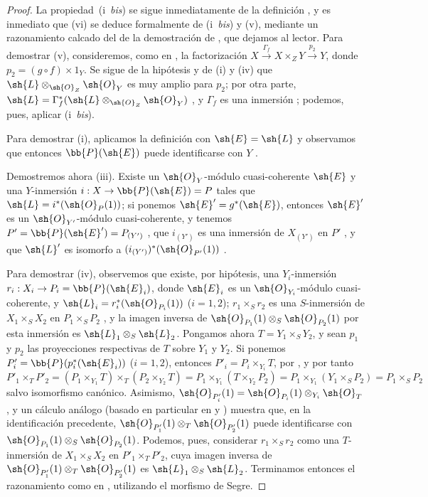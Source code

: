 \documentclass[oneside,10pt]{amsart}
\makeatletter
\newcommand{\ega@arrow}[2]{\mathchoice{#1}{#2}{#2}{#2}}
\renewcommand{\to}{\ega@arrow{\longrightarrow}{\rightarrow}}
\newcommand{\oldpage}[2][]{\marginnote{\normalfont\footnotesize\textbf{#1}~|~#2}\ignorespaces}
\makeatother
\begin{document}
\begin{proof}
La propiedad~(i~\emph{bis}) se sigue inmediatamente de la definición , y es inmediato que (vi) se deduce formalmente de (i~\emph{bis}) y (v), mediante un razonamiento calcado del de la demostración de , que dejamos al lector.
Para demostrar (v), consideremos, como en , la factorización $X\xrightarrow{\Gamma_f}X\times_Z Y\xrightarrow{p_2}Y$, donde $p_2=(g\circ f)\times1_Y$.
Se sigue de la hipótesis y de (i) y (iv) que $\sh{L}\otimes_{\sh{O}_Z}\sh{O}_Y$ es muy amplio para $p_2$;
por otra parte, $\sh{L}=\Gamma_f^*(\sh{L}\otimes_{\sh{O}_Z}\sh{O}_Y)$ , y $\Gamma_f$ es una inmersión ;
podemos, pues, aplicar (i~\emph{bis}).

\oldpage[II]{82}
Para demostrar (i), aplicamos la definición  con $\sh{E}=\sh{L}$ y observamos que entonces $\bb{P}(\sh{E})$ puede identificarse con $Y$ .

Demostremos ahora (iii).
Existe un $\sh{O}_Y$-módulo cuasi-coherente $\sh{E}$ y una $Y$-inmersión $i:X\to\bb{P}(\sh{E})=P$ tales que $\sh{L}=i^*(\sh{O}_P(1))$;
si ponemos $\sh{E}'=g^*(\sh{E})$, entonces $\sh{E}'$ es un $\sh{O}_{Y'}$-módulo cuasi-coherente, y tenemos $P'=\bb{P}(\sh{E}')=P_{(Y')}$ , que $i_{(Y')}$ es una inmersión de $X_{(Y')}$ en $P'$ , y que $\sh{L}'$ es isomorfo a $(i_{(Y')})^*(\sh{O}_{P'}(1))$ .

Para demostrar (iv), observemos que existe, por hipótesis, una $Y_i$-inmersión $r_i:X_i\to P_i=\bb{P}(\sh{E}_i)$, donde $\sh{E}_i$ es un $\sh{O}_{Y_i}$-módulo cuasi-coherente, y $\sh{L}_i=r_i^*(\sh{O}_{P_i}(1))$ ($i=1,2$);
$r_1\times_S r_2$ es una $S$-inmersión de $X_1\times_S X_2$ en $P_1\times_S P_2$ , y la imagen inversa de $\sh{O}_{P_1}(1)\otimes_S\sh{O}_{P_2}(1)$ por esta inmersión es $\sh{L}_1\otimes_S\sh{L}_2$.
Pongamos ahora $T=Y_1\times_S Y_2$, y sean $p_1$ y $p_2$ las proyecciones respectivas de $T$ sobre $Y_1$ y $Y_2$.
Si ponemos $P'_i=\bb{P}(p_i^*(\sh{E}_i))$ ($i=1,2$), entonces $P'_i=P_i\times_{Y_i}T$, por , y por tanto
\[
  P'_1\times_T P'_2
  =(P_1\times_{Y_1}T)\times_T(P_2\times_{Y_2}T)
  =P_1\times_{Y_1}(T\times_{Y_2}P_2)
  =P_1\times_{Y_1}(Y_1\times_S P_2)
  =P_1\times_S P_2
\]
salvo isomorfismo canónico.
Asimismo, $\sh{O}_{P'_i}(1)=\sh{O}_{P_i}(1)\otimes_{Y_i}\sh{O}_T$ , y un cálculo análogo (basado en particular en  y ) muestra que, en la identificación precedente, $\sh{O}_{P'_1}(1)\otimes_T\sh{O}_{P'_2}(1)$ puede identificarse con $\sh{O}_{P_1}(1)\otimes_S\sh{O}_{P_2}(1)$.
Podemos, pues, considerar $r_1\times_S r_2$ como una $T$-inmersión de $X_1\times_S X_2$ en $P'_1\times_T P'_2$, cuya imagen inversa de $\sh{O}_{P'_1}(1)\otimes_T\sh{O}_{P'_2}(1)$ es $\sh{L}_1\otimes_S\sh{L}_2$.
Terminamos entonces el razonamiento como en , utilizando el morfismo de Segre.


\end{proof}
\end{document}
